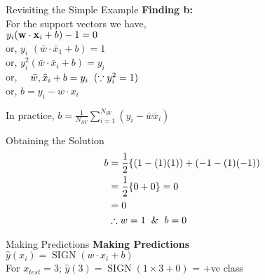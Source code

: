 \documentclass{beamer}
\begin{document}
\begin{frame}{Revisiting the Simple Example}
\textbf{Finding b:}\\
For the support vectors we have, \\

$y_{i}(\mathbf{w} \cdot \mathbf{x}_{i}+b)-1=0$\\
or, $y_{i}$ $\left(\bar{w} \cdot \bar{x}_{1}+b\right)=1$\\
or, $y_{i}^{2}\left(\bar{w} \cdot \bar{x}_{i}+b\right)=y_{i}$\\
or, $\quad \bar{w}, \bar{x}_{i}+b=y_{i} \hspace{2mm}(\because y_{i}^{2} = 1)$\\
or, $b= y_i - w \cdot x_i$

In practice, $b=\frac{1}{N_{SV}} \sum_{i=1}^{N_{SV}}\left(y_{i}-\bar{w}\bar{x}_{i}\right)$

\end{frame}

\begin{frame}{Obtaining the Solution}
\begin{align*}
\begin{aligned}
b &=\frac{1}{2}\{(1-(1)(1))+(-1-(1)(-1))\\
&=\frac{1}{2}\{0+0\}=0 \\
&=0 \\
& \therefore w = 1 \hspace{2mm}\& \hspace{2mm} b = 0
\end{aligned}
\end{align*}
\end{frame}

\begin{frame}{Making Predictions}
\textbf{Making Predictions} \\
\hspace{2cm} $\hat{y}(x_i) = \operatorname{SIGN}(w \cdot x_i + b)$\\

For $x_{test} = 3$; $\hat{y}(3) = \operatorname{SIGN}(1 \times 3 + 0)$ = +ve class
\end{frame}
\end{document}
